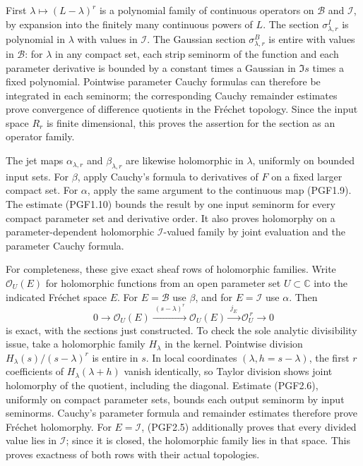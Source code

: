 First \(\lambda\mapsto(L-\lambda)^r\) is a polynomial family of
continuous operators on \(\mathcal B\) and \(\mathcal I\), by expansion
into the finitely many continuous powers of \(L\). The section
\(\sigma^I_{\lambda,r}\) is polynomial in \(\lambda\) with values in
\(\mathcal I\). The Gaussian section \(\sigma^B_{\lambda,r}\) is entire
with values in \(\mathcal B\): for \(\lambda\) in any compact set, each
strip seminorm of the function and each parameter derivative is bounded
by a constant times a Gaussian in \(\Im s\) times a fixed polynomial.
Pointwise parameter Cauchy formulas can therefore be integrated in each
seminorm; the corresponding Cauchy remainder estimates prove convergence
of difference quotients in the Fréchet topology. Since the input space
\(R_r\) is finite dimensional, this proves the assertion for the section
as an operator family.

The jet maps \(\alpha_{\lambda,r}\) and \(\beta_{\lambda,r}\) are
likewise holomorphic in \(\lambda\), uniformly on bounded input sets.
For \(\beta\), apply Cauchy's formula to derivatives of \(F\) on a fixed
larger compact set. For \(\alpha\), apply the same argument to the
continuous map (PGF1.9). The estimate (PGF1.10) bounds the result by one
input seminorm for every compact parameter set and derivative order. It
also proves holomorphy on a parameter-dependent holomorphic
\(\mathcal I\)-valued family by joint evaluation and the parameter
Cauchy formula.

For completeness, these give exact sheaf rows of holomorphic families.
Write \(\mathcal O_U(E)\) for holomorphic functions from an open
parameter set \(U\subset\mathbb C\) into the indicated Fréchet space
\(E\). For \(E=\mathcal B\) use \(\beta\), and for \(E=\mathcal I\) use
\(\alpha\). Then \[
0\longrightarrow\mathcal O_U(E)
\xrightarrow{\ (s-\lambda)^r\ }\mathcal O_U(E)
\xrightarrow{\ j_E\ }\mathcal O_U^{\,r}
\longrightarrow0
\tag{PGF6.1}
\] is exact, with the sections just constructed. To check the sole
analytic divisibility issue, take a holomorphic family \(H_\lambda\) in
the kernel. Pointwise division \(H_\lambda(s)/(s-\lambda)^r\) is entire
in \(s\). In local coordinates \((\lambda,h=s-\lambda)\), the first
\(r\) coefficients of \(H_\lambda(\lambda+h)\) vanish identically, so
Taylor division shows joint holomorphy of the quotient, including the
diagonal. Estimate (PGF2.6), uniformly on compact parameter sets, bounds
each output seminorm by input seminorms. Cauchy's parameter formula and
remainder estimates therefore prove Fréchet holomorphy. For
\(E=\mathcal I\), (PGF2.5) additionally proves that every divided value
lies in \(\mathcal I\); since it is closed, the holomorphic family lies
in that space. This proves exactness of both rows with their actual
topologies.

